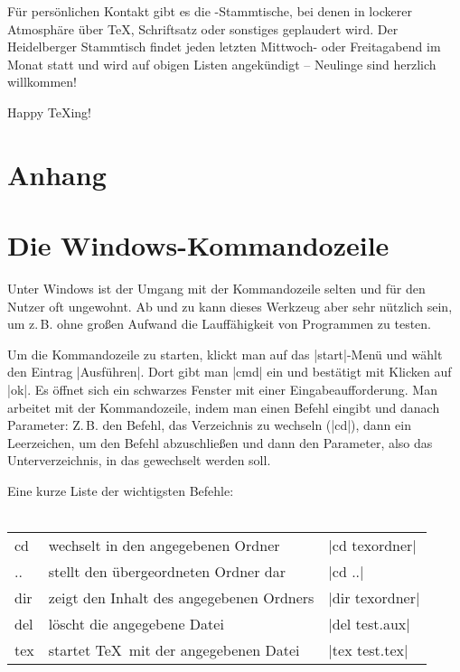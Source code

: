 \documentclass[12pt,ngerman]{scrartcl}
\begin{document}
Für persönlichen Kontakt gibt es die \DANTE-Stammtische, bei denen in lockerer Atmosphäre über \TeX, Schriftsatz oder sonstiges geplaudert wird. Der Heidelberger Stammtisch findet jeden letzten Mittwoch- oder Freitagabend im Monat statt und wird auf obigen Listen angekündigt – Neulinge sind herzlich willkommen!
\vspace{1cm}

Happy \TeX{}ing!

\newpage
\begin{appendix}
\section*{Anhang}
\section{Die Windows-Kommandozeile}
Unter\label{cmd} Windows ist der Umgang mit der Kommandozeile selten und für den Nutzer oft ungewohnt. Ab und zu kann dieses Werkzeug aber sehr nützlich sein, um z.\,B. ohne großen Aufwand die Lauffähigkeit von Programmen zu testen.

Um die Kommandozeile zu starten, klickt man auf das |start|-Menü und wählt den Eintrag |Ausführen|. Dort gibt man |cmd| ein und bestätigt mit Klicken auf |ok|. Es öffnet sich ein schwarzes Fenster mit einer Eingabeaufforderung. Man arbeitet mit der Kommandozeile, indem man einen Befehl eingibt und danach Parameter: Z.\,B. den Befehl, das Verzeichnis zu wechseln (|cd|), dann ein Leerzeichen, um den Befehl abzuschließen und dann den Parameter, also das Unterverzeichnis, in das gewechselt werden soll.

Eine kurze Liste der wichtigsten Befehle:
\\ \\\hfill
\begin{minipage}{\textwidth}
\begin{tabular}{lll}
  cd & wechselt in den angegebenen Ordner & |cd texordner|\\
  .. & stellt den übergeordneten Ordner dar & |cd ..|\\
  dir & zeigt den Inhalt des angegebenen Ordners & |dir texordner|\\
  del & löscht die angegebene Datei & |del test.aux|\\
  tex & startet \TeX\ mit der angegebenen Datei & |tex test.tex|\\
\end{tabular}
\end{minipage}\hfill
\end{appendix}
\end{document}
